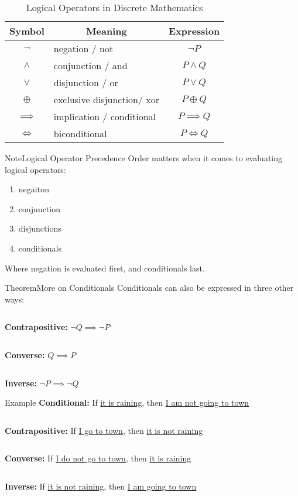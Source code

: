 \documentclass{MathNotes}
\newenvironment{example}[1]{\begin{BlueBox}{Example}{#1}}{\end{BlueBox}}
\newenvironment{note}[1]{\begin{YellowBox}{Note}{#1}}{\end{YellowBox}}
\newenvironment{theorem}[1]{\begin{GrayBox}{Theorem}{#1}}{\end{GrayBox}}
\newcommand{\bl}{
	\newline$ $\newline
}
\begin{document}
\begin{table}[h!]\label{tab:logical-operators}
	\centering
	\caption{Logical Operators in Discrete Mathematics}
	\begin{tabular}{clc}
		\multicolumn{1}{c}{\textbf{Symbol}}   &
		\multicolumn{1}{c}{\textbf{Meaning} } &
		\multicolumn{1}{c}{\textbf{Expression}}                                            \\
		\midrule
		$\lnot$                               & negation / not             & $\lnot P$     \\
		$\land$                               & conjunction / and          & $P\land Q$    \\
		$\lor$                                & disjunction / or           & $P\lor Q$     \\
		$\oplus$                              & exclusive disjunction/ xor & $P\oplus Q$   \\
		$\implies$                            & implication / conditional  & $P\implies Q$ \\
		$\iff$                                & biconditional              & $P\iff Q$     \\
	\end{tabular}
\end{table}

\begin{note}{Logical Operator Precedence}\label{order-of-operations}
	Order matters when it comes to evaluating logical operators:
	\begin{enumerate}
		\item negaiton
		\item conjunction
		\item disjunctions
		\item conditionals
	\end{enumerate}
	Where negation is evaluated first, and conditionals last.
\end{note}

\newpage
\begin{multicols}{2}
	\begin{theorem}{More on Conditionals}\label{th:conditionals-extra}
		Conditionals can also be expressed in three other ways:
		\bl
		\textbf{Contrapositive:} $\lnot Q\implies\lnot P$
		\bl
		\textbf{Converse:} $Q\implies P$
		\bl
		\textbf{Inverse:} $\lnot P\implies\lnot Q$
	\end{theorem}
	\begin{example}{}
		\textbf{Conditional:} If \underline{it is raining}, then \underline{I am not going to town}
		\bl
		\textbf{Contrapositive:} If \underline{I go to town}, then \underline{it is not raining}
		\bl
		\textbf{Converse:} If \underline{I do not go to town}, then \underline{it is raining}
		\bl
		\textbf{Inverse:} If \underline{it is not raining}, then \underline{I am going to town}
	\end{example}
\end{multicols}
\end{document}
